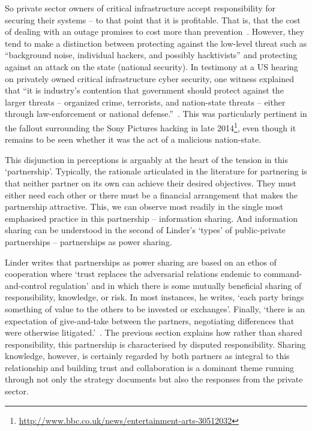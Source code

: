 \documentclass[a4paper,11pt]{article}
\begin{document}
So private sector owners of critical infrastructure accept
responsibility for securing their systems -- to that point that it is
profitable. That is, that the cost of dealing with an outage promises
to cost more than
prevention~\cite{bisinfosecbreaches:2014,cybergovhealthcheck:2014}. However,
they tend to make a distinction between protecting against the
low-level threat such as ``background noise, individual hackers, and
possibly hacktivists'' and protecting against an attack on the state
(national security). In testimony at a US hearing on privately owned
critical infrastructure cyber security, one witness explained that
``it is industry's contention that government should protect against
the larger threats -- organized crime, terrorists, and nation-state
threats -- either through law-enforcement or national
defense.''~\cite{vanardo:2005}. This was particularly pertinent in the
fallout surrounding the Sony Pictures hacking in late
2014\footnote{\url{http://www.bbc.co.uk/news/entertainment-arts-30512032}},
even though it remains to be seen whether it was the act of a
malicious nation-state.

This disjunction in perceptions is arguably at the heart of the
tension in this `partnership'. Typically, the rationale articulated in
the literature for partnering is that neither partner on its own can
achieve their desired objectives. They must either need each other or
there must be a financial arrangement that makes the partnership
attractive. This, we can observe most readily in the single most
emphasised practice in this partnership -- information sharing. And
information sharing can be understood in the second of Linder's
`types' of public-private partnerships -- partnerships as power
sharing.

Linder writes that partnerships as power sharing are based on an ethos
of cooperation where `trust replaces the adversarial relations endemic
to command-and-control regulation' and in which there is some mutually
beneficial sharing of responsibility, knowledge, or risk. In most
instances, he writes, `each party brings something of value to the
others to be invested or exchanges'. Finally, `there is an expectation
of give-and-take between the partners, negotiating differences that
were otherwise litigated.'~\cite{linder:1999}.  The previous section
explains how rather than shared responsibility, this partnership is
characterised by disputed responsibility. Sharing knowledge, however,
is certainly regarded by both partners as integral to this
relationship and building trust and collaboration is a dominant theme
running through not only the strategy documents but also the responses
from the private sector.
\end{document}
